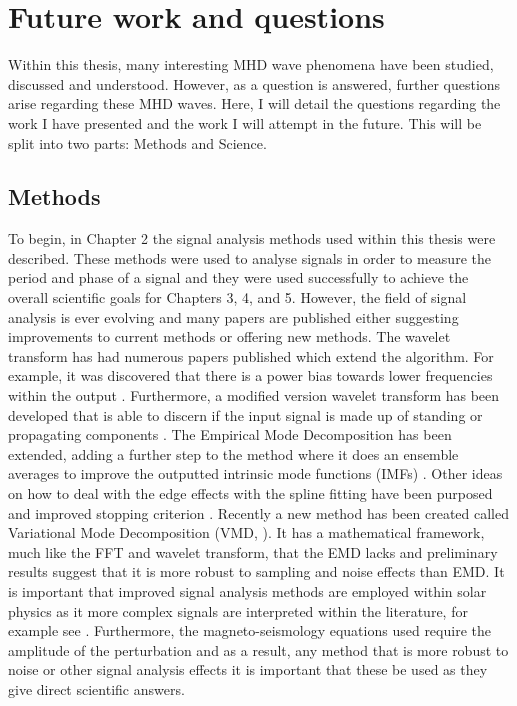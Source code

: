 \section{Future work and questions}

	Within this thesis, many interesting MHD wave phenomena have been studied, discussed and understood.
    However, as a question is answered, further questions arise regarding these MHD waves.
    Here, I will detail the questions regarding the work I have presented and the work I will attempt in the future.
    This will be split into two parts: Methods and Science.
    
    \subsection{Methods}

	To begin, in Chapter 2 the signal analysis methods used within this thesis were described.
	These methods were used to analyse signals in order to measure the period and phase of a signal and they were used successfully to achieve the overall scientific goals for Chapters 3, 4, and 5.
	However, the field of signal analysis is ever evolving and many papers are published either suggesting improvements to current methods or offering new methods.
    The wavelet transform has had numerous papers published which extend the algorithm.
    For example, it was discovered that there is a power bias towards lower frequencies within the output \citep{liu2007rectification,veleda2012cross}.
    Furthermore, a modified version wavelet transform has been developed that is able to discern if the input signal is made up of standing or propagating components \citep{2008SoPh..248..395S}.
    The Empirical Mode Decomposition has been extended, adding a further step to the method where it does an ensemble averages to improve the outputted intrinsic mode functions (IMFs) \citep{wu2009ensemble}.
    Other ideas on how to deal with the edge effects with the spline fitting have been purposed \citep{zeng2004simple} and improved stopping criterion \citep{huang2008review}.
    Recently a new method has been created called Variational Mode Decomposition (VMD, \citealt{6655981}).
    It has a mathematical framework, much like the FFT and wavelet transform, that the EMD lacks and preliminary results suggest that it is more robust to sampling and noise effects than EMD.
    It is important that improved signal analysis methods are employed within solar physics as it more complex signals are interpreted within the literature, for example see \cite{refId0}. 
    Furthermore, the magneto-seismology equations used require the amplitude of the perturbation and as a result, any method that is more robust to noise or other signal analysis effects it is important that these be used as they give direct scientific answers.

